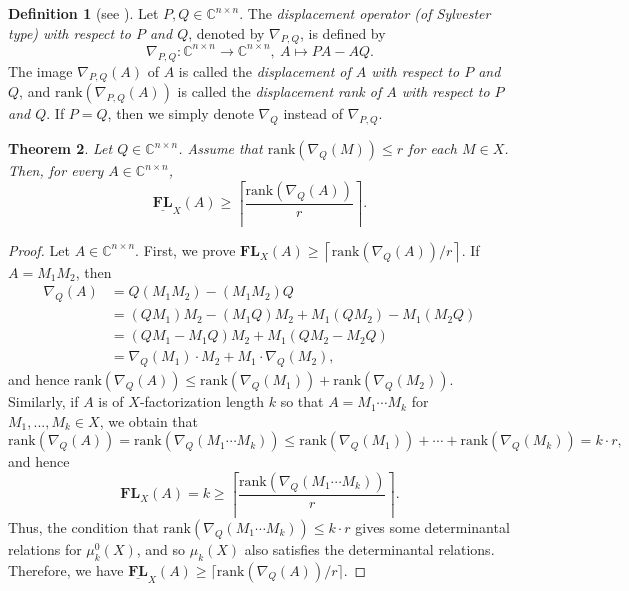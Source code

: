 \documentclass[reqno]{amsart}
\newtheorem{theorem}{Theorem}[section]
\theoremstyle{definition}
\newtheorem{definition}[theorem]{Definition}
\newcommand{\rank}{\mathrm{rank}}
\numberwithin{equation}{section}
\begin{document}
\begin{definition}[see {\cite[Section 1.3]{MR1843842}}]
    Let $P,Q \in \mathbb{C}^{n \times n}$. The \emph{displacement operator (of Sylvester type) with respect to $P$ and $Q$}, denoted by $\nabla_{P,Q}$, is defined by
    \begin{equation*}
        \nabla_{P,Q}:\mathbb{C}^{n \times n} \rightarrow \mathbb{C}^{n \times n},~A \mapsto PA-AQ.
    \end{equation*}
    The image $\nabla_{P,Q}(A)$ of $A$ is called the \emph{displacement of $A$ with respect to $P$ and $Q$}, and $\rank(\nabla_{P,Q}(A))$ is called the \emph{displacement rank of $A$ with respect to $P$ and $Q$}. If $P=Q$, then we simply denote $\nabla_{Q}$ instead of $\nabla_{P,Q}$.
\end{definition}

\begin{theorem}\label{thm:lower bound from displacement rank, one matrix}
    Let $Q \in \mathbb{C}^{n \times n}$. Assume that $\rank(\nabla_{Q}(M)) \leq r$ for each $M \in X$. Then, for every $A \in \mathbb{C}^{n \times n}$,
    \begin{equation*}
        \underline{\mathbf{FL}}_X(A) \geq \left\lceil \frac{\rank(\nabla_{Q}(A))}{r} \right\rceil.
    \end{equation*}
\end{theorem}
\begin{proof}
    Let $A \in \mathbb{C}^{n\times n}$. First, we prove $\mathbf{FL}_X(A) \geq \left\lceil \rank(\nabla_{Q}(A))/r \right\rceil$. If $A=M_1M_2$, then
    \begin{equation*}
        \begin{aligned}
            \nabla_{Q}(A)&=Q(M_1M_2)-(M_1M_2)Q\\
            &=(QM_1)M_2-(M_1Q)M_2+M_1(QM_2)-M_1(M_2Q)\\
            &=(QM_1-M_1Q)M_2+M_1(QM_2-M_2Q)\\
            &=\nabla_{Q}(M_1)\cdot M_2+M_1 \cdot \nabla_{Q}(M_2),
        \end{aligned}
    \end{equation*}
    and hence $\rank(\nabla_{Q}(A))\leq \rank(\nabla_{Q}(M_1))+\rank(\nabla_{Q}(M_2))$. Similarly, if $A$ is of $X$-factorization length $k$ so that $A=M_1\cdots M_k$ for $M_1,...,M_k \in X$, we obtain that
    \begin{equation*}
        \rank(\nabla_{Q}(A))=\rank(\nabla_{Q}(M_1\cdots M_k)) \leq \rank(\nabla_{Q}(M_1))+\cdots+\rank(\nabla_{Q}(M_k)) = k \cdot r,
    \end{equation*}
    and hence
    \begin{equation*}
        \mathbf{FL}_X(A) = k \geq \left\lceil \frac{\rank(\nabla_{Q}(M_1\cdots M_k))}{r} \right\rceil.
    \end{equation*}
    Thus, the condition that $\rank(\nabla_{Q}(M_1\cdots M_k)) \leq k \cdot r$ gives some determinantal relations for $\mu_k^0(X)$, and so $\mu_k(X)$ also satisfies the determinantal relations. Therefore, we have $\underline{\mathbf{FL}}_X(A) \geq \lceil \rank(\nabla_{Q}(A))/r \rceil$.
\end{proof}
\end{document}
